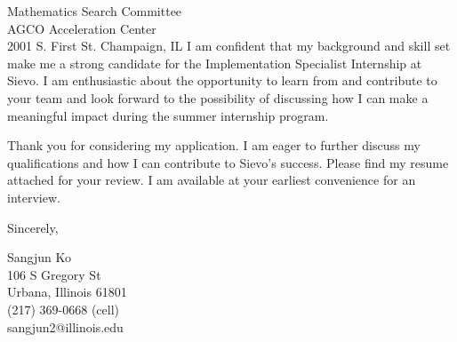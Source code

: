 \documentclass{letter}
\begin{document}
\begin{letter}{Mathematics Search Committee\\
AGCO Acceleration Center\\
2001 S. First St. Champaign, IL}
I am confident that my background and skill set make me a strong candidate for the Implementation Specialist Internship at Sievo. I am enthusiastic about the opportunity to learn from and contribute to your team and look forward to the possibility of discussing how I can make a meaningful impact during the summer internship program.

Thank you for considering my application. I am eager to further discuss my qualifications and how I can contribute to Sievo's success. Please find my resume attached for your review. I am available at your earliest convenience for an interview.



\closing{Sincerely,
}

Sangjun Ko\\
106 S Gregory St\\
Urbana, Illinois 61801\\
(217) 369-0668 (cell)\\sangjun2@illinois.edu
\end{letter}
\end{document}
